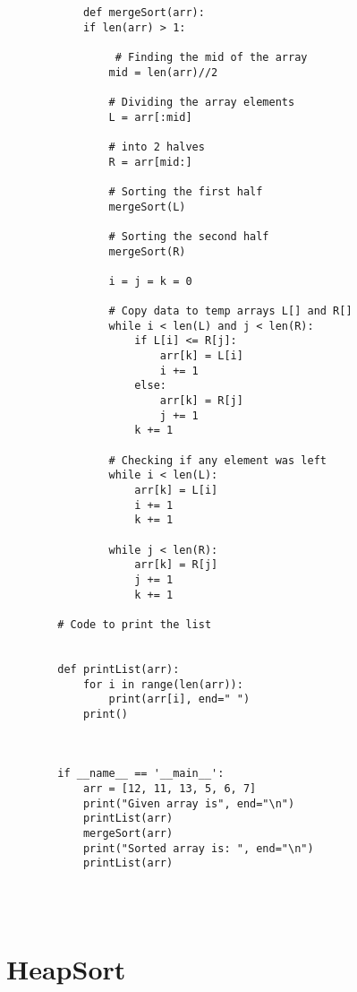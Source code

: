\begin{verbatim}
            def mergeSort(arr):
            if len(arr) > 1:
          
                 # Finding the mid of the array
                mid = len(arr)//2
          
                # Dividing the array elements
                L = arr[:mid]
          
                # into 2 halves
                R = arr[mid:]
          
                # Sorting the first half
                mergeSort(L)
          
                # Sorting the second half
                mergeSort(R)
          
                i = j = k = 0
          
                # Copy data to temp arrays L[] and R[]
                while i < len(L) and j < len(R):
                    if L[i] <= R[j]:
                        arr[k] = L[i]
                        i += 1
                    else:
                        arr[k] = R[j]
                        j += 1
                    k += 1
          
                # Checking if any element was left
                while i < len(L):
                    arr[k] = L[i]
                    i += 1
                    k += 1
          
                while j < len(R):
                    arr[k] = R[j]
                    j += 1
                    k += 1
          
        # Code to print the list
          
          
        def printList(arr):
            for i in range(len(arr)):
                print(arr[i], end=" ")
            print()
          
          
        
        if __name__ == '__main__':
            arr = [12, 11, 13, 5, 6, 7]
            print("Given array is", end="\n")
            printList(arr)
            mergeSort(arr)
            print("Sorted array is: ", end="\n")
            printList(arr)
        
\end{verbatim}\\



\section*{HeapSort}

